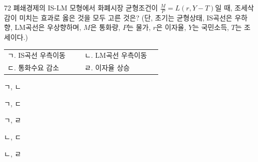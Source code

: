 \begin{question}{72}
폐쇄경제의 IS-LM 모형에서 화폐시장 균형조건이 $\frac{M}{P} = L(r, Y - T)$일 때, 조세삭감이 미치는 효과로 옳은 것을 모두 고른 것은? (단, 초기는 균형상태, IS곡선은 우하향, LM곡선은 우상향하며, $M$은 통화량, $P$는 물가, $r$은 이자율, $Y$는 국민소득, $T$는 조세이다.)
\begin{framedtext}
\begin{tabular}{@{}p{0.45\linewidth}p{0.45\linewidth}@{}}
ㄱ. IS곡선 우측이동 & ㄴ. LM곡선 우측이동 \\
ㄷ. 통화수요 감소 & ㄹ. 이자율 상승 \\
\end{tabular}
\end{framedtext}
\begin{choices}
  \item ㄱ, ㄴ
  \item ㄱ, ㄷ
  \item ㄱ, ㄹ
  \item ㄴ, ㄷ
  \item ㄴ, ㄹ
\end{choices}
\end{question}
